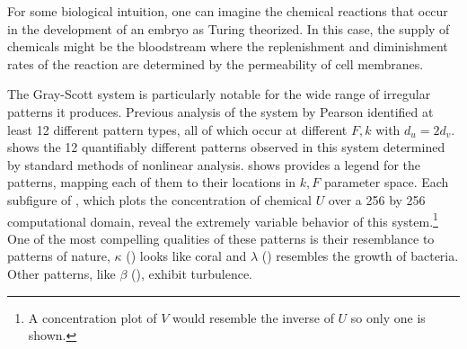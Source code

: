 For some biological intuition, one can imagine the chemical reactions that occur in the development of an embryo as Turing theorized. In this case, the supply of chemicals might be the bloodstream where the replenishment and diminishment rates of the reaction are determined by the permeability of cell membranes.

The Gray-Scott system is particularly notable for the wide range of irregular patterns it produces. Previous analysis of the system by Pearson identified at least 12 different pattern types, all of which occur at different $F, k$ with $d_u = 2 d_v$.  shows the 12 quantifiably different patterns observed in this system determined by standard methods of nonlinear analysis.  shows provides a legend for the patterns, mapping each of them to their locations in $k, F$ parameter space. Each subfigure of , which plots the concentration of chemical $U$ over a 256 by 256 computational domain, reveal the extremely variable behavior of this system.\footnote{A concentration plot of $V$ would resemble the inverse of $U$ so only one is shown.} One of the most compelling qualities of these patterns is their resemblance to patterns of nature, \eg $\kappa$ () looks like coral and $\lambda$ () resembles the growth of bacteria. Other patterns, like $\beta$ (), exhibit turbulence.

